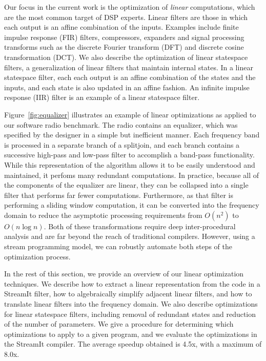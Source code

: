 Our focus in the current work is the optimization of {\it linear}
computations, which are the most common target of DSP experts.  Linear
filters are those in which each output is an affine combination of the
inputs.  Examples include finite impulse response (FIR) filters,
compressors, expanders and signal processing transforms such as the
discrete Fourier transform (DFT) and discrete cosine transformation
(DCT).  We also describe the optimization of linear statespace
filters, a generalization of linear filters that maintain internal
states.  In a linear statespace filter, each each output is an affine
combination of the states and the inputs, and each state is also
updated in an affine fashion.  An infinite impulse response (IIR)
filter is an example of a linear statespace filter.

Figure~\ref{fig:equalizer} illustrates an example of linear
optimizations as applied to our software radio benchmark.  The radio
contains an equalizer, which was specified by the designer in a simple
but inefficient manner.  Each frequency band is processed in a
separate branch of a splitjoin, and each branch contains a successive
high-pass and low-pass filter to accomplish a band-pass functionality.
While this representation of the algorithm allows it to be easily
understood and maintained, it perfoms many redundant computations.  In
practice, because all of the components of the equalizer are linear,
they can be collapsed into a single filter that performs far fewer
computations.  Furthermore, as that filter is performing a sliding
window computation, it can be converted into the frequency domain to
reduce the asymptotic processing requirements from $O(n^2)$ to $O(n
\log n)$.  Both of these transformations require deep inter-procedural
analysis and are far beyond the reach of traditional compilers.
However, using a stream programming model, we can robustly automate
both steps of the optimization process.

In the rest of this section, we provide an overview of our linear
optimization techniques.  We describe how to extract a linear
representation from the code in a StreamIt filter, how to
algebraically simplify adjacent linear filters, and how to translate
linear filters into the frequency domain.  We also describe
optimizations for linear statespace filters, including removal of
redundant states and reduction of the number of parameters.  We give a
procedure for determining which optimizations to apply to a given
program, and we evaluate the optimizations in the StreamIt compiler.
The average speedup obtained is 4.5x, with a maximum of 8.0x.

